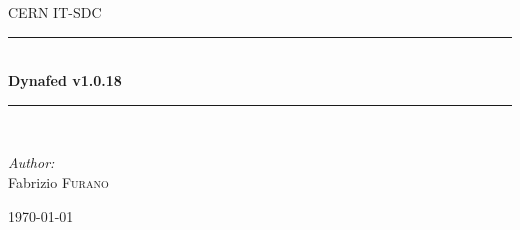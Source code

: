 \documentclass[12pt]{article} %
\begin{document}

\begin{titlepage}

\newcommand{\HRule}{\rule{\linewidth}{0.5mm}} %

\center %

\textsc{\LARGE CERN IT-SDC}\\[1.5cm] %

\HRule \\[0.4cm]
{ \huge \bfseries Dynafed v1.0.18}\\[0.4cm] %
\HRule \\[1.5cm]

\begin{minipage}{0.4\textwidth}
\begin{flushleft} \large
\emph{Author:}\\
Fabrizio \textsc{Furano} \\ %
\end{flushleft}
\end{minipage}

{\large \today}\\[3cm] %




\vfill %

\end{titlepage}
\end{document}
